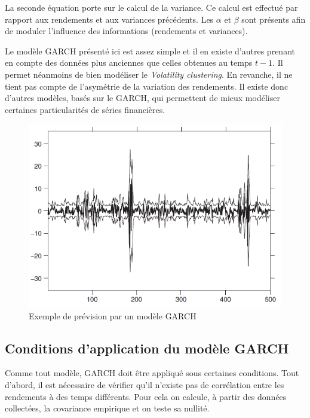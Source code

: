 			La seconde équation porte sur le calcul de la variance. Ce calcul est effectué par rapport aux rendements et aux variances précédents. Les $\alpha$ et $\beta$ sont présents afin de moduler l'influence des informations (rendements et variances).

			Le modèle GARCH présenté ici est assez simple et il en existe d'autres prenant en compte des données plus anciennes que celles obtenues au temps $t-1$. Il permet néanmoins de bien modéliser le \textit{Volatility clustering}. En revanche, il ne tient pas compte de l'asymétrie de la variation des rendements. Il existe donc d'autres modèles, basés sur le GARCH, qui permettent de mieux modéliser certaines particularités de séries financières.

			\begin{figure}[ht]
				\center
				\includegraphics{AjustementParGarch.png}
				\caption{Exemple de prévision par un modèle GARCH}
				\label{ajustement_garch}
			\end{figure}


		\subsection{Conditions d'application du modèle GARCH}
		\label{subsubsection:condition-garch}
			Comme tout modèle, GARCH doit être appliqué sous certaines conditions. Tout d'abord, il est nécessaire de vérifier qu'il n'existe pas de corrélation entre les rendements à des temps différents.
			Pour cela on calcule, à partir des données collectées, la covariance empirique et on teste sa nullité. 

